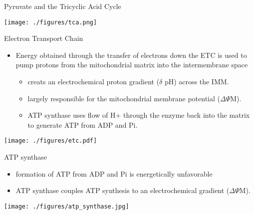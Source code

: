 \documentclass[presentation, smaller]{beamer}
\begin{document}
\begin{frame}[label={sec:org1f24cc1}]{Pyruvate and the Tricyclic Acid Cycle}
\begin{center}
\texttt{[image: ./figures/tca.png]}
\end{center}
\end{frame}

\begin{frame}[label={sec:orgacc0559}]{Electron Transport Chain}
\begin{itemize}
\item Energy obtained through the transfer of electrons down the ETC is used to pump protons from the mitochondrial matrix into the intermembrane space
\begin{itemize}
\item creats an electrochemical proton gradient (\(\delta\) pH) across the IMM.
\item largely responsible for the mitochondrial membrane potential (\(\Delta \Psi\)M).
\item ATP synthase uses flow of H+ through the enzyme back into the matrix to generate ATP from ADP and Pi.
\end{itemize}
\end{itemize}


\begin{center}
\texttt{[image: ./figures/etc.pdf]}
\end{center}
\end{frame}

\begin{frame}[label={sec:org7d96e80}]{ATP synthase}
\begin{itemize}
\item formation of ATP from ADP and Pi is energetically unfavorable
\item ATP synthase couples ATP synthesis to an electrochemical gradient (\(\Delta \Psi\)M).
\end{itemize}

\begin{center}
\texttt{[image: ./figures/atp\_synthase.jpg]}
\label{orgf0948b5}
\end{center}

\centering
{}
\end{frame}
\end{document}
